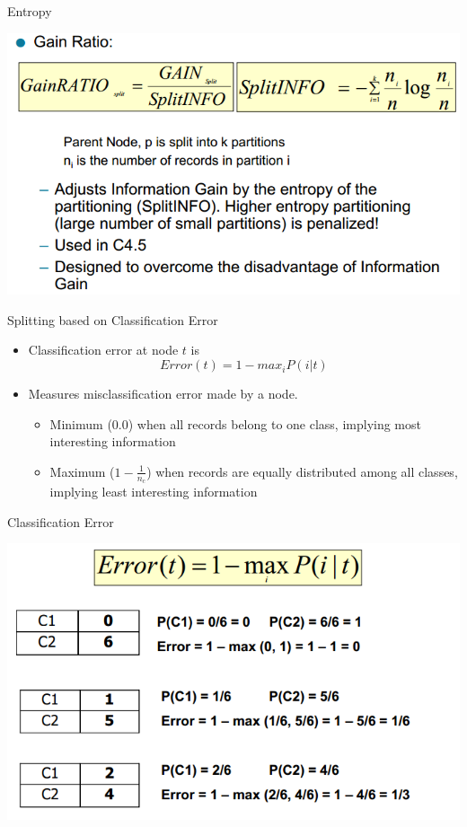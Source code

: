 \documentclass{beamer}
\begin{document}
\begin{frame}{Entropy}
    \begin{center}
        \includegraphics[scale=0.4]{entropy4.png}
    \end{center}
\end{frame}


\begin{frame}{Splitting based on Classification Error}
    \begin{itemize}
        \item Classification error at node $t$ is $$Error(t) = 1 - max_{i} P(i|t)$$
        \item Measures misclassification error made by a node.
        \begin{itemize}
            \item Minimum ($0.0$) when all records belong to one class, implying  most interesting information
            \item Maximum ($1 - \frac{1}{n_c}$) when records are equally distributed among all classes, implying least interesting information
        \end{itemize}
    \end{itemize}
\end{frame}
\begin{frame}{Classification Error}
    \begin{center}
        \includegraphics[scale=0.4]{classificationError.png}
    \end{center}
\end{frame}
\end{document}
